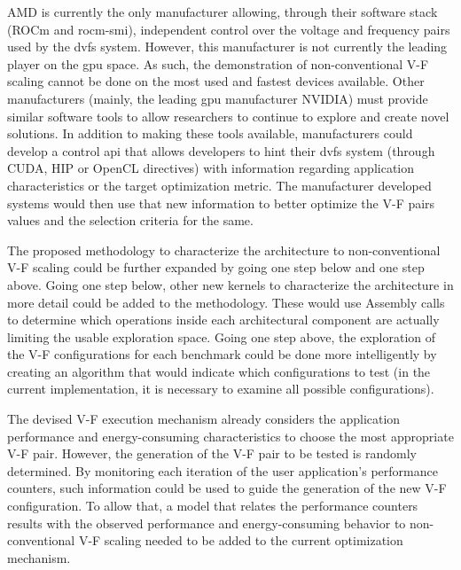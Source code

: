 AMD is currently the only manufacturer allowing, through their software stack (ROCm and rocm-smi), independent control over the voltage and frequency pairs used by the \acrshort{dvfs} system. However, this manufacturer is not currently the leading player on the \acrshort{gpu} space. As such, the demonstration of non-conventional V-F scaling cannot be done on the most used and fastest devices available. Other manufacturers (mainly, the leading \acrshort{gpu} manufacturer NVIDIA) must provide similar software tools to allow researchers to continue to explore and create novel solutions. In addition to making these tools available, manufacturers could develop a control \acrshort{api} that allows developers to hint their \acrshort{dvfs} system (through CUDA, HIP or OpenCL directives) with information regarding application characteristics or the target optimization metric. The manufacturer developed systems would then use that new information to better optimize the V-F pairs values and the selection criteria for the same.

The proposed methodology to characterize the architecture to non-conventional V-F scaling could be further expanded by going one step below and one step above. Going one step below, other new kernels to characterize the architecture in more detail could be added to the methodology. These would use Assembly calls to determine which operations inside each architectural component are actually limiting the usable exploration space. Going one step above, the exploration of the V-F configurations for each benchmark could be done more intelligently by creating an algorithm that would indicate which configurations to test (in the current implementation, it is necessary to examine all possible configurations).

The devised V-F execution mechanism already considers the application performance and energy-consuming characteristics to choose the most appropriate V-F pair. However, the generation of the V-F pair to be tested is randomly determined. By monitoring each iteration of the user application's performance counters, such information could be used to guide the generation of the new V-F configuration. To allow that, a model that relates the performance counters results with the observed performance and energy-consuming behavior to non-conventional V-F scaling needed to be added to the current optimization mechanism.

